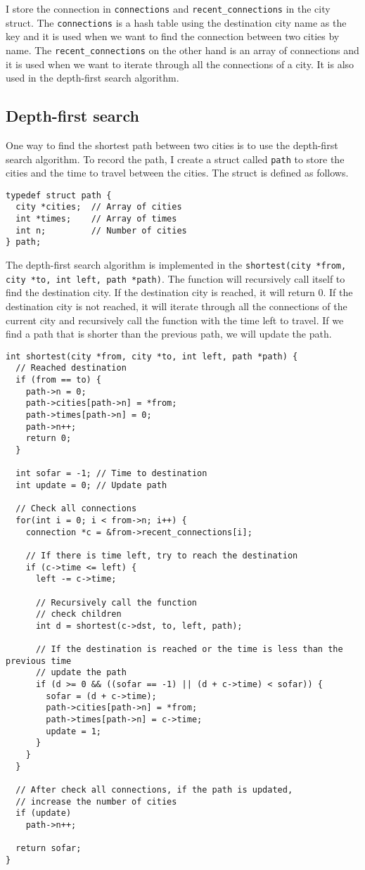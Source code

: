 \documentclass[a4paper,11pt]{article}
\begin{document}
I store the connection in {\tt *connections} and {\tt *recent\_connections} in the city struct.
The {\tt *connections} is a hash table using the destination city name as the key and it is used
when we want to find the connection between two cities by name. 
The {\tt *recent\_connections} on the other hand is an array of connections and it is used when
we want to iterate through all the connections of a city. It is also used in the depth-first search
algorithm.

\subsection*{Depth-first search}

One way to find the shortest path between two cities is to use the depth-first search algorithm.
To record the path, I create a struct called {\tt path} to store the cities and the time to travel between
the cities. The struct is defined as follows.

\begin{verbatim}
typedef struct path {
  city *cities;  // Array of cities
  int *times;    // Array of times
  int n;         // Number of cities
} path;
\end{verbatim}

The depth-first search algorithm is implemented in the {\tt shortest(city *from, city *to, int left, path *path)}.
The function will recursively call itself to find the destination city. If the destination city is reached,
it will return 0. If the destination city is not reached, it will iterate through all the connections of the
current city and recursively call the function with the time left to travel. If we find a path that is shorter
than the previous path, we will update the path.

\begin{verbatim}
int shortest(city *from, city *to, int left, path *path) {
  // Reached destination
  if (from == to) {
    path->n = 0;
    path->cities[path->n] = *from;
    path->times[path->n] = 0;
    path->n++;
    return 0;
  }

  int sofar = -1; // Time to destination
  int update = 0; // Update path

  // Check all connections
  for(int i = 0; i < from->n; i++) {
    connection *c = &from->recent_connections[i];

    // If there is time left, try to reach the destination
    if (c->time <= left) {
      left -= c->time;

      // Recursively call the function
      // check children
      int d = shortest(c->dst, to, left, path);

      // If the destination is reached or the time is less than the previous time
      // update the path
      if (d >= 0 && ((sofar == -1) || (d + c->time) < sofar)) {
        sofar = (d + c->time);
        path->cities[path->n] = *from;
        path->times[path->n] = c->time;
        update = 1;
      }
    }
  }

  // After check all connections, if the path is updated, 
  // increase the number of cities
  if (update)
    path->n++;

  return sofar;
}
\end{verbatim}
\end{document}
